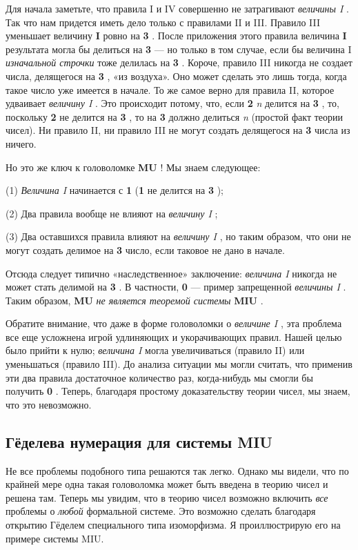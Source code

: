 \documentclass[../main.tex]{subfiles}
\begin{document}
Для начала заметьте, что правила I и IV совершенно не затрагивают \emph{величины I} . Так что нам придется иметь дело только с правилами II и III. Правило III уменьшает величину \textbf{I} ровно на \textbf{3} . После приложения этого правила величина \textbf{I} результата могла бы делиться на \textbf{3} --- но только в том случае, если бы величина I \emph{изначальной строчки} тоже делилась на \textbf{3} . Короче, правило III никогда не создает числа, делящегося на \textbf{3} , «из воздуха». Оно может сделать это лишь тогда, когда такое число уже имеется в начале. То же самое верно для правила II, которое удваивает \emph{величину I} . Это происходит потому, что, если \textbf{2} \emph{n} делится на \textbf{3} , то, поскольку \textbf{2} не делится на \textbf{3} , то на \textbf{3} должно делиться \emph{n} (простой факт теории чисел). Ни правило II, ни правило III не могут создать делящегося на \textbf{3} числа из ничего.

Но это же ключ к головоломке \textbf{MU} ! Мы знаем следующее:

(1) \emph{Величина I} начинается с \textbf{1} (\textbf{1} не делится на \textbf{3} );

(2) Два правила вообще не влияют на \emph{величину I} ;

(3) Два оставшихся правила влияют на \emph{величину I} , но таким образом, что они не могут создать делимое на \textbf{3} число, если таковое не дано в начале.

Отсюда следует типично «наследственное» заключение: \emph{величина I} никогда не может стать делимой на \textbf{3} . В частности, \textbf{0} --- пример запрещенной \emph{величины I} . Таким образом, \textbf{MU} \emph{не является теоремой системы} \textbf{MIU} .

Обратите внимание, что даже в форме головоломки о \emph{величине I} , эта проблема все еще усложнена игрой удлиняющих и укорачивающих правил. Нашей целью было прийти к нулю; \emph{величина I} могла увеличиваться (правило II) или уменьшаться (правило III). До анализа ситуации мы могли считать, что применив эти два правила достаточное количество раз, когда-нибудь мы смогли бы получить \textbf{0} . Теперь, благодаря простому доказательству теории чисел, мы знаем, что это невозможно.


\subsection{Гёделева нумерация для системы MIU}

Не все проблемы подобного типа решаются так легко. Однако мы видели, что по крайней мере одна такая головоломка может быть введена в теорию чисел и решена там. Теперь мы увидим, что в теорию чисел возможно включить \emph{все} проблемы о \emph{любой} формальной системе. Это возможно сделать благодаря открытию Гёделем специального типа изоморфизма. Я проиллюстрирую его на примере системы MIU.
\end{document}
